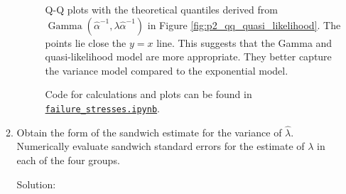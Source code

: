 \documentclass[letterpaper,11pt]{article}
\begin{document}
\begin{enumerate}
\begin{enumerate}
\begin{description}
        Q-Q plots with the theoretical quantiles derived from
        $\operatorname{Gamma}\left(\hat{\alpha}^{-1},
          \lambda\hat{\alpha}^{-1}\right)$ in Figure
        \ref{fig:p2_qq_quasi_likelihood}. The points lie close the $y = x$
        line. This suggests that the Gamma and quasi-likelihood model are more
        appropriate. They better capture the variance model compared to the
        exponential model.

        Code for calculations and plots can be found in
        \href{https://nbviewer.jupyter.org/github/ppham27/stat570/blob/master/hw3/failure\_stresses.ipynb}{\texttt{failure\_stresses.ipynb}}.
      \end{description}
    \item Obtain the form of the sandwich estimate for the variance of
      $\hat{\lambda}$. Numerically evaluate sandwich standard errors for the
      estimate of $\lambda$ in each of the four groups.

      \begin{description}
      \item[Solution:] 
      \end{description}
    \end{enumerate}
\end{enumerate}
\end{document}
